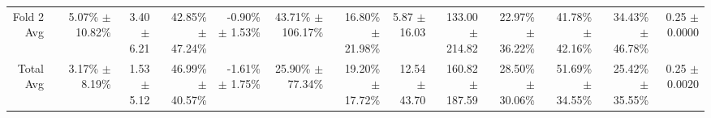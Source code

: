 \begin{table}[H]
{\begin{tabular}{rrrrrrrrrrrrrr}
Fold 2 Avg &  & \shortstack{5.07\% \\ $\pm$ 10.82\%} & \shortstack{3.40 \\ $\pm$ 6.21} & \shortstack{42.85\% \\ $\pm$ 47.24\%} & \shortstack{-0.90\% \\ $\pm$ 1.53\%} & \shortstack{43.71\% \\ $\pm$ 106.17\%} & \shortstack{16.80\% \\ $\pm$ 21.98\%} & \shortstack{5.87 \\ $\pm$ 16.03} & \shortstack{133.00 \\ $\pm$ 214.82} & \shortstack{22.97\% \\ $\pm$ 36.22\%} & \shortstack{41.78\% \\ $\pm$ 42.16\%} & \shortstack{34.43\% \\ $\pm$ 46.78\%} & \shortstack{0.25 \\ $\pm$ 0.0000} \\
Total Avg &  & \shortstack{3.17\% \\ $\pm$ 8.19\%} & \shortstack{1.53 \\ $\pm$ 5.12} & \shortstack{46.99\% \\ $\pm$ 40.57\%} & \shortstack{-1.61\% \\ $\pm$ 1.75\%} & \shortstack{25.90\% \\ $\pm$ 77.34\%} & \shortstack{19.20\% \\ $\pm$ 17.72\%} & \shortstack{12.54 \\ $\pm$ 43.70} & \shortstack{160.82 \\ $\pm$ 187.59} & \shortstack{28.50\% \\ $\pm$ 30.06\%} & \shortstack{51.69\% \\ $\pm$ 34.55\%} & \shortstack{25.42\% \\ $\pm$ 35.55\%} & \shortstack{0.25 \\ $\pm$ 0.0020} \\
\bottomrule
\end{tabular}}
\end{table}
